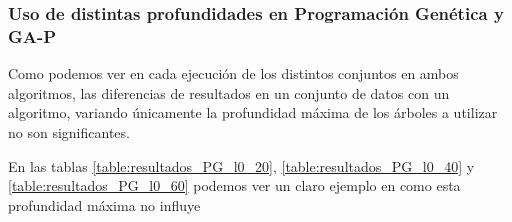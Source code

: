 \begin{table}[H]
\centering
{}
\caption{Resumen de los resultados obtenidos de media en el conjunto de datos completo con sobremuestreo.}\label{table:resumen_completo_over}
\end{table}


\subsubsection{Uso de distintas profundidades en Programación Genética y GA-P}

Como podemos ver en cada ejecución de los distintos conjuntos en ambos algoritmos, las diferencias de resultados en un conjunto de datos con un algoritmo, variando únicamente la profundidad máxima de los árboles a utilizar no son significantes.

En las tablas \ref{table:resultados_PG_l0_20}, \ref{table:resultados_PG_l0_40} y \ref{table:resultados_PG_l0_60} podemos ver un claro ejemplo en como esta profundidad máxima no influye

